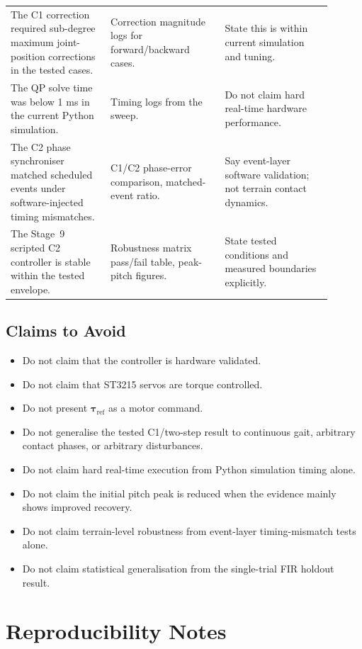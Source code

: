\documentclass[12pt,a4paper]{report}
\begin{document}
\begin{longtable}{@{}p{0.28\linewidth}p{0.32\linewidth}p{0.30\linewidth}@{}}
The C1 correction required sub-degree maximum joint-position corrections in the tested cases. & Correction magnitude logs for forward/backward cases. & State this is within current simulation and tuning. \\
The QP solve time was below 1 ms in the current Python simulation. & Timing logs from the sweep. & Do not claim hard real-time hardware performance. \\
The C2 phase synchroniser matched scheduled events under software-injected timing mismatches. & C1/C2 phase-error comparison, matched-event ratio. & Say event-layer software validation; not terrain contact dynamics. \\
The Stage~9 scripted C2 controller is stable within the tested envelope. & Robustness matrix pass/fail table, peak-pitch figures. & State tested conditions and measured boundaries explicitly. \\
\bottomrule
\end{longtable}
 
\section{Claims to Avoid}
\begin{itemize}
    \item Do not claim that the controller is hardware validated.
    \item Do not claim that ST3215 servos are torque controlled.
    \item Do not present $\boldsymbol{\tau}_{\mathrm{ref}}$ as a motor command.
    \item Do not generalise the tested C1/two-step result to continuous gait, arbitrary contact phases, or arbitrary disturbances.
    \item Do not claim hard real-time execution from Python simulation timing alone.
    \item Do not claim the initial pitch peak is reduced when the evidence mainly shows improved recovery.
    \item Do not claim terrain-level robustness from event-layer timing-mismatch tests alone.
    \item Do not claim statistical generalisation from the single-trial FIR holdout result.
\end{itemize}
 
\chapter{Reproducibility Notes}
 
\end{document}
